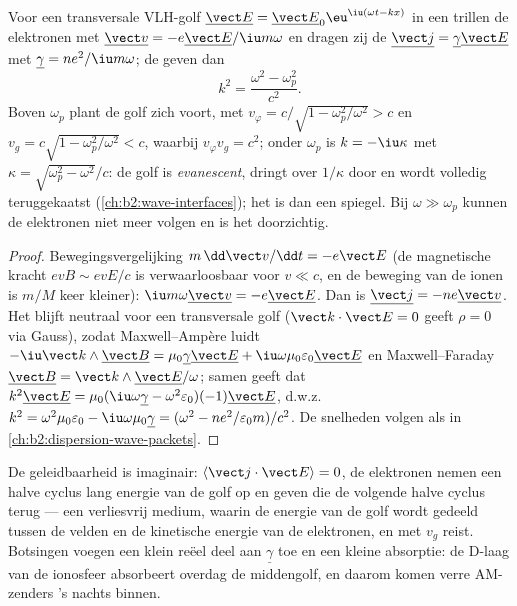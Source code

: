 \begin{theorem}\label{thm:b2:waves-in-media:plasmadispersion}
Voor een transversale VLH-golf
$\underline{\vect E} = \underline{\vect E}_0\eu^{\iu(\omega t - kx)}$ in een
 trillen de elektronen met
$\underline{\vect v} = -e\underline{\vect E}/\iu m\omega$ en dragen zij de
 $\underline{\vect j} = \underline\gamma\underline{\vect E}$
met $\underline\gamma = ne^2/\iu m\omega$; de 
geven dan
\[
k^2 = \frac{\omega^2 - \omega_p^2}{c^2} .
\]
Boven $\omega_p$ plant de golf zich voort, met
$v_\varphi = c/\sqrt{1 - \omega_p^2/\omega^2}
> c$ en
$v_g = c\sqrt{1 - \omega_p^2/\omega^2} < c$, waarbij $v_\varphi v_g = c^2$;
onder $\omega_p$ is $k = -\iu\kappa$ met
$\kappa = \sqrt{\omega_p^2 - \omega^2}/c$: de golf is \emph{evanescent},
dringt over $1/\kappa$ door en wordt volledig teruggekaatst
(\cref{ch:b2:wave-interfaces}); het  is dan een spiegel. Bij
$\omega
\gg \omega_p$ kunnen de elektronen niet meer volgen en is het 
doorzichtig.
\end{theorem}

\begin{proof}
Bewegingsvergelijking $m\,\dd\vect v/\dd t = -e\vect E$ (de magnetische
kracht $ev B \sim evE/c$ is verwaarloosbaar voor $v \ll c$, en de beweging
van de ionen is $m/M$ keer kleiner):
$\iu m\omega\underline{\vect v} = -e\underline{\vect E}$. Dan is
$\underline{\vect j} = -ne\underline{\vect v}$. Het  blijft neutraal
voor een transversale golf ($\vect k\cdot\vect E = 0$ geeft $\rho = 0$ via
Gauss), zodat Maxwell--Ampère luidt
$-\iu\vect k\wedge\underline{\vect B} = \mu_0\underline\gamma\underline{\vect E}
+ \iu\omega\mu_0\varepsilon_0\underline{\vect E}$
en Maxwell--Faraday
$\underline{\vect B} = \vect k
\wedge\underline{\vect E}/\omega$; samen
geeft dat
$k^2\underline{\vect E} = \mu_0(\iu\omega\underline\gamma -
\omega^2\varepsilon_0)(-1)\underline{\vect E}$,
d.w.z.\
$k^2 = \omega^2\mu_0\varepsilon_0 - \iu\omega\mu_0
\underline\gamma = (\omega^2 - ne^2/\varepsilon_0m)/c^2$.
De snelheden volgen als in \cref{ch:b2:dispersion-wave-packets}.
\end{proof}

\begin{remark}\label{rem:b2:waves-in-media:plasmaenergy}
De geleidbaarheid is imaginair: $\langle\vect j\cdot\vect E\rangle = 0$, de
elektronen nemen een halve cyclus lang energie van de golf op en geven die
de volgende halve cyclus terug --- een verliesvrij medium, waarin de energie
van de golf wordt gedeeld tussen de velden en de kinetische energie van de
elektronen, en met $v_g$ reist. Botsingen voegen een klein reëel deel aan
$\underline\gamma$ toe en een kleine absorptie: de D-laag van de ionosfeer
absorbeert overdag de middengolf, en daarom komen verre AM-zenders 's nachts
binnen.
\end{remark}

